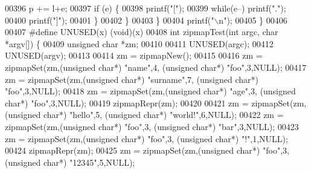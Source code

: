 \begin{DoxyCode}
{{{{{00396             p += l+e;
00397             \textcolor{keywordflow}{if} (e) \{
00398                 printf(\textcolor{stringliteral}{"["});
00399                 \textcolor{keywordflow}{while}(e--) printf(\textcolor{stringliteral}{"."});
00400                 printf(\textcolor{stringliteral}{"]"});
00401             \}
00402         \}
00403     \}
00404     printf(\textcolor{stringliteral}{"\(\backslash\)n"});
00405 \}
00406 
00407 \textcolor{preprocessor}{#}\textcolor{preprocessor}{define} \textcolor{preprocessor}{UNUSED}\textcolor{preprocessor}{(}\textcolor{preprocessor}{x}\textcolor{preprocessor}{)} \textcolor{preprocessor}{(}\textcolor{preprocessor}{void}\textcolor{preprocessor}{)}\textcolor{preprocessor}{(}\textcolor{preprocessor}{x}\textcolor{preprocessor}{)}
00408 \textcolor{keywordtype}{int} zipmapTest(\textcolor{keywordtype}{int} argc, \textcolor{keywordtype}{char} *argv[]) \{
00409     \textcolor{keywordtype}{unsigned} \textcolor{keywordtype}{char} *zm;
00410 
00411     UNUSED(argc);
00412     UNUSED(argv);
00413 
00414     zm = zipmapNew();
00415 
00416     zm = zipmapSet(zm,(\textcolor{keywordtype}{unsigned} \textcolor{keywordtype}{char}*) \textcolor{stringliteral}{"name"},4, (\textcolor{keywordtype}{unsigned} \textcolor{keywordtype}{char}*) \textcolor{stringliteral}{"foo"},3,NULL);
00417     zm = zipmapSet(zm,(\textcolor{keywordtype}{unsigned} \textcolor{keywordtype}{char}*) \textcolor{stringliteral}{"surname"},7, (\textcolor{keywordtype}{unsigned} \textcolor{keywordtype}{char}*) \textcolor{stringliteral}{"foo"},3,NULL);
00418     zm = zipmapSet(zm,(\textcolor{keywordtype}{unsigned} \textcolor{keywordtype}{char}*) \textcolor{stringliteral}{"age"},3, (\textcolor{keywordtype}{unsigned} \textcolor{keywordtype}{char}*) \textcolor{stringliteral}{"foo"},3,NULL);
00419     zipmapRepr(zm);
00420 
00421     zm = zipmapSet(zm,(\textcolor{keywordtype}{unsigned} \textcolor{keywordtype}{char}*) \textcolor{stringliteral}{"hello"},5, (\textcolor{keywordtype}{unsigned} \textcolor{keywordtype}{char}*) \textcolor{stringliteral}{"world!"},6,NULL);
00422     zm = zipmapSet(zm,(\textcolor{keywordtype}{unsigned} \textcolor{keywordtype}{char}*) \textcolor{stringliteral}{"foo"},3, (\textcolor{keywordtype}{unsigned} \textcolor{keywordtype}{char}*) \textcolor{stringliteral}{"bar"},3,NULL);
00423     zm = zipmapSet(zm,(\textcolor{keywordtype}{unsigned} \textcolor{keywordtype}{char}*) \textcolor{stringliteral}{"foo"},3, (\textcolor{keywordtype}{unsigned} \textcolor{keywordtype}{char}*) \textcolor{stringliteral}{"!"},1,NULL);
00424     zipmapRepr(zm);
00425     zm = zipmapSet(zm,(\textcolor{keywordtype}{unsigned} \textcolor{keywordtype}{char}*) \textcolor{stringliteral}{"foo"},3, (\textcolor{keywordtype}{unsigned} \textcolor{keywordtype}{char}*) \textcolor{stringliteral}{"12345"},5,NULL);
}}}}}
\end{DoxyCode}
